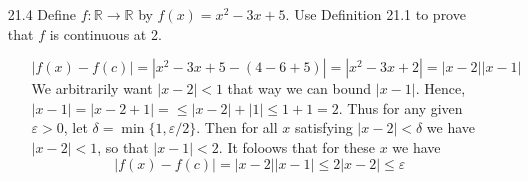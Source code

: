 \documentclass[12pt]{article}
\begin{document}
\begin{enumerate}
\begin{enumerate}
\item[21.4] Define $f: \mathbb{R} \rightarrow \mathbb{R}$ by $f(x) = x^2 - 3x + 5$. Use Definition 21.1 to prove that $f$ is continuous at 2.
\begin{enumerate}
\item[] 
\[ 
|f(x) - f(c)| = |x^2 - 3x + 5 - (4 - 6 + 5)| = |x^2 - 3x + 2| = |x - 2||x - 1|
\]
We arbitrarily want $|x - 2| < 1$ that way we can bound $|x - 1|$. Hence, 
$|x - 1| = |x - 2 + 1| = \leq |x - 2| + |1| \leq 1 + 1 = 2$. Thus for any given
$\varepsilon > 0$, let $\delta = \min \{1, \varepsilon /2 \}$. Then for all $x$
satisfying $|x - 2| < \delta$ we have $|x - 2| < 1$, so that $|x - 1| < 2$. It
foloows that for these $x$ we have 
\[
|f(x) - f(c)| = |x - 2||x - 1| \leq 2|x - 2| \leq \varepsilon
\]
\end{enumerate}


\end{enumerate}
\end{enumerate}
\end{document}
